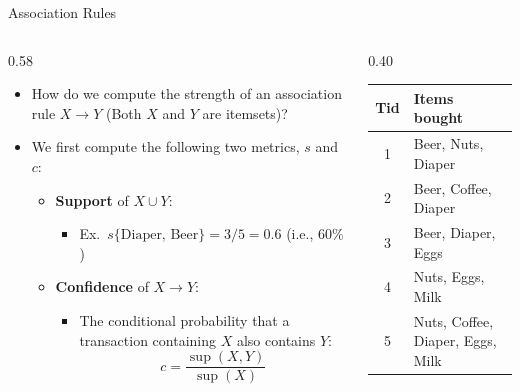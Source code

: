 \documentclass[aspectratio=169, 11pt]{beamer}
\begin{document}
\begin{frame}{Association Rules}
    \begin{columns}[T]
        \begin{column}{0.58\textwidth}
            \footnotesize
            \begin{itemize}
                \item How do we compute the strength of an association rule $X \rightarrow Y$ (Both $X$ and $Y$ are itemsets)?
                \item We first compute the following two metrics, $s$ and $c$:
                \begin{itemize}
                    \item \textbf{Support} of $X \cup Y$:
                    \begin{itemize}
                        \item Ex.\ $s\{\text{Diaper, Beer}\} = 3/5 = 0.6$ (i.e., $60\%$)
                    \end{itemize}
                    \item \textbf{Confidence} of $X \rightarrow Y$:
                    \begin{itemize}
                        \item The conditional probability that a transaction containing $X$ also contains $Y$:
                        $$c = \frac{\sup(X, Y)}{\sup(X)}$$
                     \end{itemize}
                \end{itemize}
            \end{itemize}
        \end{column}
        \begin{column}{0.40\textwidth}
            \centering
            \footnotesize
            \begin{tabular}{cl}
                \toprule
                \textbf{Tid} & \textbf{Items bought} \\
                \midrule
                1 & Beer, Nuts, Diaper \\
                2 & Beer, Coffee, Diaper \\
                3 & Beer, Diaper, Eggs \\
                4 & Nuts, Eggs, Milk \\
                5 & Nuts, Coffee, Diaper, Eggs, Milk \\

\end{tabular}
\end{column}
\end{columns}
\end{frame}
\end{document}
